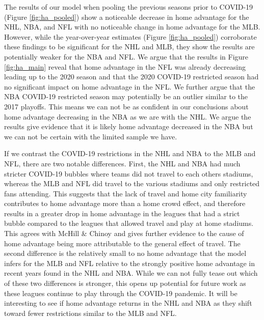 The results of our model when pooling the previous seasons prior to COVID-19 (Figure \mbox{\ref{fig:ha_pooled}}) show a noticeable decrease in home advantage for the NHL, NBA, and NFL with no noticeable change in home advantage for the MLB. However, while the year-over-year estimates (Figure \mbox{\ref{fig:ha_pooled}}) corroborate these findings to be significant for the NHL and MLB, they show the results are potentially weaker for the NBA and NFL. We argue that the results in Figure \mbox{\ref{fig:ha_main}} reveal that home advantage in the NFL was already decreasing leading up to the 2020 season and that the 2020 COVID-19 restricted season had no significant impact on home advantage in the NFL. We further argue that the NBA COVID-19 restricted season may potentially be an outlier similar to the 2017 playoffs. This means we can not be as confident in our conclusions about home advantage decreasing in the NBA as we are with the NHL. We argue the results give evidence that it is likely home advantage decreased in the NBA but we can not be certain with the limited sample we have.


If we contrast the COVID-19 restrictions in the NHL and NBA to the MLB and NFL, there are two notable differences. First, the NHL and NBA had much stricter COVID-19 bubbles where teams did not travel to each others stadiums, whereas the MLB and NFL did travel to the various stadiums and only restricted fans attending. This suggests that the lack of travel and home city familiarity contributes to home advantage more than a home crowd effect, and therefore results in a greater drop in home advantage in the leagues that had a strict bubble compared to the leagues that allowed travel and play at home stadiums. This agrees with McHill \& Chinoy \cite{McHill2020} and gives further evidence to the cause of home advantage being more attributable to the general effect of travel. The second difference is the relatively small to no home advantage that the model infers for the MLB and NFL relative to the strongly positive home advantage in recent years found in the NHL and NBA. While we can not fully tease out which of these two differences is stronger, this opens up potential for future work as these leagues continue to play through the COVID-19 pandemic. It will be interesting to see if home advantage returns in the NHL and NBA as they shift toward fewer restrictions similar to the MLB and NFL.

